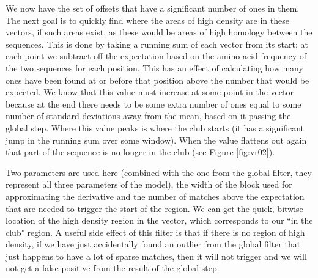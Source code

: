 \documentclass[phd,tocprelim]{cornell}
\begin{document}
We now have the set of offsets that have a significant number of ones in them. The next goal is to quickly find where the areas of high density are in these vectors, if such areas exist, as these would be areas of high homology between the sequences. This is done by taking a running sum of each vector from its start; at each point we subtract off the expectation based on the amino acid frequency of the two sequences for each position. This has an effect of calculating how many ones have been found at or before that position above the number that would be expected. We know that this value must increase at some point in the vector because at the end there needs to be some extra number of ones equal to some number of standard deviations away from the mean, based on it passing the global step. Where this value peaks is where the club starts (it has a significant jump in the running sum over some window). When the value flattens out again that part of the sequence is no longer in the club (see Figure \ref{fig:vr02}).

Two parameters are used here (combined with the one from the global filter, they represent all three parameters of the model), the width of the block used for approximating the derivative and the number of matches above the expectation that are needed to trigger the start of the region. We can get the quick, bitwise location of the high density region in the vector, which corresponds to our ``in the club" region. A useful side effect of this filter is that if there is no region of high density, if we have just accidentally found an outlier from the global filter that just happens to have a lot of sparse matches, then it will not trigger and we will not get a false positive from the result of the global step.
\end{document}
